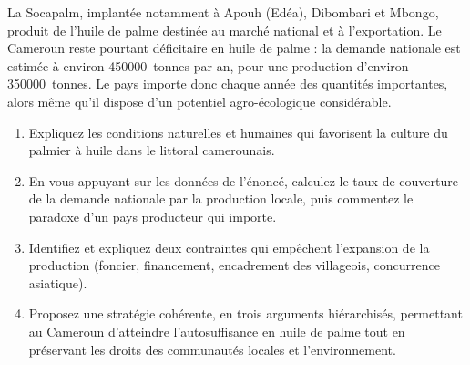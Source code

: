 \documentclass[11pt]{article}
\begin{document}
\begin{exercice}
La Socapalm, implantée notamment à Apouh (Edéa), Dibombari et Mbongo, produit de l'huile de palme destinée au marché national et à l'exportation. Le Cameroun reste pourtant déficitaire en huile de palme : la demande nationale est estimée à environ \SI{450000}{tonnes} par an, pour une production d'environ \SI{350000}{tonnes}. Le pays importe donc chaque année des quantités importantes, alors même qu'il dispose d'un potentiel agro-écologique considérable.

\begin{enumerate}
\item Expliquez les conditions naturelles et humaines qui favorisent la culture du palmier à huile dans le littoral camerounais.
\item En vous appuyant sur les données de l'énoncé, calculez le taux de couverture de la demande nationale par la production locale, puis commentez le paradoxe d'un pays producteur qui importe.
\item Identifiez et expliquez deux contraintes qui empêchent l'expansion de la production (foncier, financement, encadrement des villageois, concurrence asiatique).
\item Proposez une stratégie cohérente, en trois arguments hiérarchisés, permettant au Cameroun d'atteindre l'autosuffisance en huile de palme tout en préservant les droits des communautés locales et l'environnement.
\end{enumerate}
\end{exercice}
\end{document}
